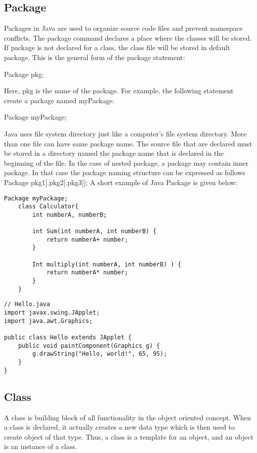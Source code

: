 \documentclass[12pt]{report}
\begin{document}
\subsection{Package}
Packages in Java are used to organize source code files and prevent namespace conflicts.
The package command declares a place where the classes will be stored. If package is not declared for a class, the class file will be stored in default package. This is the general form of the package statement:

Package pkg;

Here, pkg is the name of the package. For example, the following statement create a package named myPackage.
 
Package myPackage; 

Java uses file system directory just like a computer’s file system directory. More than one file can have same package name. The source file that are declared must be stored in a directory named the package name that is declared in the beginning of the file. 
In the case of nested package, a package may contain inner package. In that case the package naming structure can be expressed as follows 
Package pkg1[.pkg2[.pkg3]]; 
A short example of Java Package is given below:

\begin{lstlisting}
Package myPackage;
	class Calculator{
		int numberA, numberB;
			
		int Sum(int numberA, int numberB) {
			return numberA+ number;
		}
		
		Int multiply(int numberA, int numberB) ) {
			return numberA* number;
		}
	}

\end{lstlisting}
\begin{lstlisting}
// Hello.java
import javax.swing.JApplet;
import java.awt.Graphics;

public class Hello extends JApplet {
    public void paintComponent(Graphics g) {
        g.drawString("Hello, world!", 65, 95);
    }    
}
\end{lstlisting}

\subsection{Class}
A class is building block of all functionality in the object oriented concept. When a class is declared, it actually creates a new data type which is then used to create object of that type. Thus, a class is a template for an object, and an object is an instance of a class. 
\end{document}
